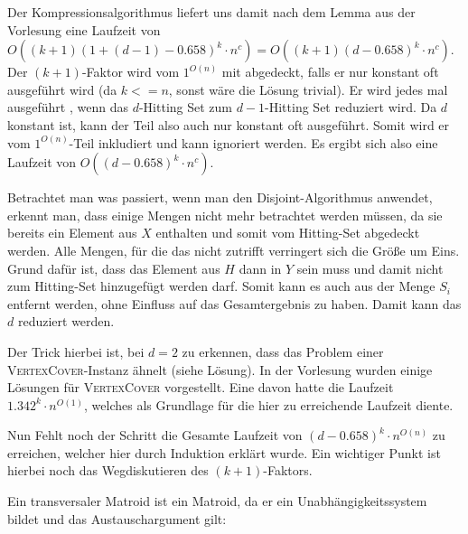 Der Kompressionsalgorithmus liefert uns damit nach dem Lemma aus der Vorlesung eine Laufzeit von $O((k+1)(1+(d-1)-0.658)^k \cdot n^c) = O((k+1)(d-0.658)^k \cdot n^c)$. Der $(k+1)$-Faktor wird vom $1^{O(n)}$ mit abgedeckt, falls er nur konstant oft ausgeführt wird (da $k <= n$, sonst wäre die Lösung trivial). Er wird jedes mal ausgeführt , wenn das $d$-Hitting Set zum $d-1$-Hitting Set reduziert wird. Da $d$ konstant ist, kann der Teil also auch nur konstant oft ausgeführt. Somit wird er vom $1^{O(n)}$-Teil inkludiert und kann ignoriert werden. Es ergibt sich also eine Laufzeit von $O((d-0.658)^k \cdot n^c)$.

\how
Betrachtet man was passiert, wenn man den Disjoint-Algorithmus anwendet, erkennt man, dass einige Mengen nicht mehr betrachtet werden müssen, da sie bereits ein Element aus $X$ enthalten und somit vom Hitting-Set abgedeckt werden. Alle Mengen, für die das nicht zutrifft verringert sich die Größe um Eins. Grund dafür ist, dass das Element aus $H$ dann in $Y$ sein muss und damit nicht zum Hitting-Set hinzugefügt werden darf. Somit kann es auch aus der Menge $S_i$ entfernt werden, ohne Einfluss auf das Gesamtergebnis zu haben. Damit kann das $d$ reduziert werden. 

Der Trick hierbei ist, bei $d=2$ zu erkennen, dass das Problem einer \textsc{VertexCover}-Instanz ähnelt (siehe Lösung). In der Vorlesung wurden einige Lösungen für \textsc{VertexCover} vorgestellt. Eine davon hatte die Laufzeit $1.342^k \cdot n^{O(1)}$, welches als Grundlage für die hier zu erreichende Laufzeit diente.

Nun Fehlt noch der Schritt die Gesamte Laufzeit von $(d-0.658)^k \cdot n^{O(n)}$ zu erreichen, welcher hier durch Induktion erklärt wurde. Ein wichtiger Punkt ist hierbei noch das Wegdiskutieren des $(k+1)$-Faktors.



\subexercise

Ein transversaler Matroid ist ein Matroid, da er ein Unabhängigkeitssystem bildet und das Austauschargument gilt:

